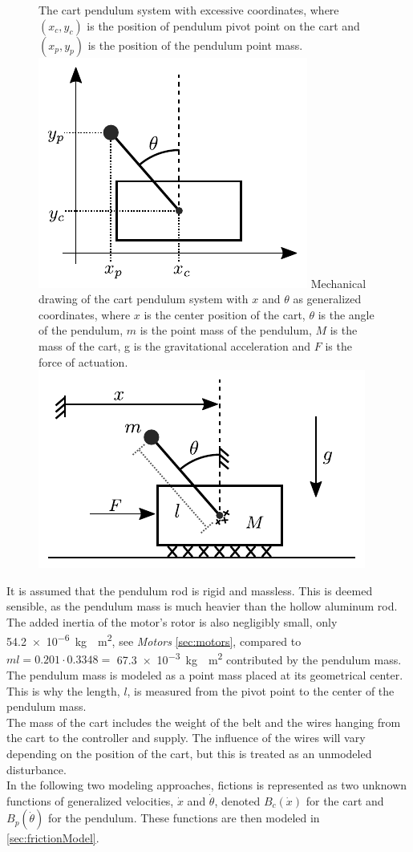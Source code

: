 \begin{figure}[H]
  \hspace{-10pt}
  \captionbox
  {
    The cart pendulum system with excessive coordinates, where $(x_c, y_c)$ is the position of pendulum pivot point on the cart and $(x_p, y_p)$ is the position of the pendulum point mass.
    \label{fig:excessiveCoordinates}
  }
  {
    \hspace{-1cm}
    \includegraphics[width=.4\textwidth]{figures/excessiveCoordinates}\vspace{-11pt}
  }
  \hspace{20pt}
  \captionbox 
  {
    Mechanical drawing of the cart pendulum system with $x$ and $\theta$ as generalized coordinates, where $x$ is the center position of the cart, $\theta$ is the angle of the pendulum, $m$ is the point mass of the pendulum, $M$ is the mass of the cart, g is the gravitational acceleration and $F$ is the force of actuation.
    \label{fig:mechanicalDrawing}
  }
  {
    \hspace{-1cm}
    \includegraphics[width=.5\textwidth]{figures/mechanicalDrawing}\vspace{6pt}
  }  
\end{figure}

It is assumed that the pendulum rod is rigid and massless. This is deemed sensible, as the pendulum mass is much heavier than the hollow aluminum rod. The added inertia of the motor's rotor is also negligibly small, only \SI{54.2e-6}{kg\cdot m^2}, see \textit{Motors} \autoref{sec:motors}, compared to $ml = 0.201 \cdot 0.3348=$ \SI{67.3e-3}{kg\cdot m^2} contributed by the pendulum mass. The pendulum mass is modeled as a point mass placed at its geometrical center. This is why the length, $l$, is measured from the pivot point to the center of the pendulum mass.\\
The mass of the cart includes the weight of the belt and the wires hanging from the cart to the controller and supply. The influence of the wires will vary depending on the position of the cart, but this is treated as an unmodeled disturbance.\\
In the following two modeling approaches, fictions is represented as two unknown functions of generalized velocities, $\dot{x}$ and $\dot{\theta}$, denoted $B_c(\dot{x})$ for the cart and $B_p(\dot{\theta})$ for the pendulum. These functions are then modeled in \autoref{sec:frictionModel}.




